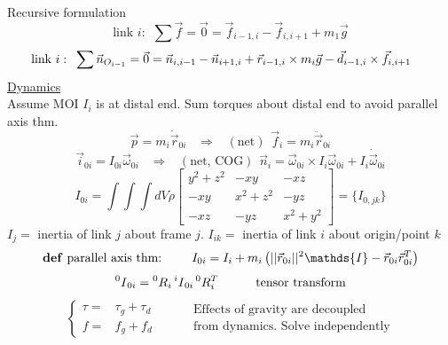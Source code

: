 \documentclass[twocolumn, 12pt]{article}    %
\begin{document}
Recursive formulation 
\begin{equation*}
    \text{link } i:  \hspace{5pt} \sum \vec{f} = \vec{0} = \vec{f}_{i-1, i} - \vec{f}_{i,i+1} + m_1 \vec{g}
\end{equation*}
\begin{equation*}
    \hspace{-15pt} \text{link } i:  \hspace{5pt} \sum \vec{n}_{O_{i-1}} = \vec{0} = \vec{n}_{i,i-1} - \vec{n}_{i+1,i} + \vec{r}_{i-1,i} \times m_i \vec{g} - \vec{d}_{i-1,i} \times \vec{f}_{i, i+1} 
\end{equation*}
\noindent \underline{Dynamics}\\
Assume MOI \(I_i\) is at distal end. Sum torques about distal end to avoid parallel axis thm.
\begin{equation*}
    \vec{p} = m_i \dot{\vec{{r}}}_{0i} \hspace{10pt} \Longrightarrow \hspace{10pt} (\text{net}) \hspace{5pt} \vec{f}_i = m_i \ddot{\vec{r}}_{0i} 
\end{equation*}
\begin{equation*}
    \vec{i}_{0i} = I_{0i} \vec{\omega}_{0i} \hspace{10pt} \Longrightarrow \hspace{10pt} (\text{net, COG}) \hspace{5pt} \vec{n}_i = \vec{\omega}_{0i} \times I_i \vec{\omega}_{0i} + I_i \dot{\vec{\omega}}_{0i}
\end{equation*}
\begin{equation*}
    I_{0i} = \int\int\int dV \rho \begin{bmatrix}
        y^2+z^2 & -xy & -xz \\
        -xy & x^2+z^2 & -yz \\
        -xz & -yz & x^2+y^2
    \end{bmatrix} = \{ I_{0,jk} \}
\end{equation*}
\(I_j=\) inertia of link \(j\) about frame \(j\). \(I_{ik}=\) inertia of link \(i\) about origin/point \(k\)
\begin{equation*}
    \text{\textbf{def} parallel axis thm: } \hspace{20pt} I_{0i} = I_i + m_i \left(||\vec{r}_{0i}||^2 \mathds{I} - \vec{r}_{0i}\vec{r}^T_{0i} \right)
\end{equation*}
\begin{equation*}
    \prescript{0}{}{I}_{0i} = \prescript{0}{}{R}_i \prescript{i}{}{I}_{0i} \prescript{0}{}{R}_i^T \hspace{30pt} \text{tensor transform}
\end{equation*}
\[
\begin{cases*}
    \tau =& \tau_g + \tau_d \\
    f =& f_g + f_d
\end{cases*}
\hspace{30pt} \begin{matrix}
    \text{Effects of gravity are decoupled}\\ 
    \text{from dynamics. Solve independently}
\end{matrix} 
\]
\end{document}

